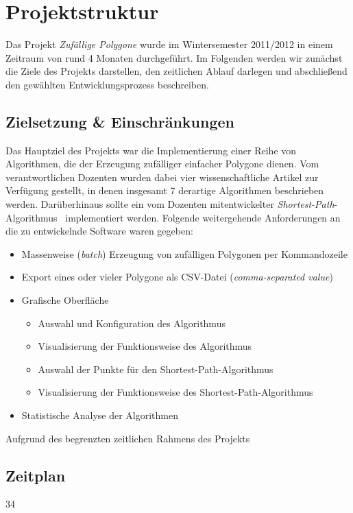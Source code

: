 \section{Projektstruktur}
Das Projekt \emph{Zufällige Polygone} wurde im Wintersemester 2011/2012 in einem Zeitraum von rund 4 Monaten durchgeführt. Im Folgenden werden wir zunächst die Ziele des Projekts darstellen, den zeitlichen Ablauf darlegen und abschließend den gewählten Entwicklungsprozess beschreiben.

\subsection{Zielsetzung \& Einschränkungen}
Das Hauptziel des Projekts war die Implementierung einer Reihe von Algorithmen, die der Erzeugung zufälliger einfacher Polygone dienen. Vom verantwortlichen Dozenten wurden dabei vier wissenschaftliche Artikel zur Verfügung gestellt, in denen insgesamt 7 derartige Algorithmen beschrieben werden. Darüberhinaus sollte ein vom Dozenten mitentwickelter \emph{Shortest-Path}-Algorithmus~\cite{asano11shortestpath} implementiert werden. Folgende weitergehende Anforderungen an die zu entwickelnde Software waren gegeben:
\begin{itemize}
\item Massenweise (\emph{batch}) Erzeugung von zufälligen Polygonen per Kommandozeile
\item Export eines oder vieler Polygone als CSV-Datei (\emph{comma-separated value})
\item Grafische Oberfläche
\begin{itemize}
\item Auswahl und Konfiguration des Algorithmus
\item Visualisierung der Funktionsweise des Algorithmus
\item Auswahl der Punkte für den Shortest-Path-Algorithmus
\item Visualisierung der Funktionsweise des Shortest-Path-Algorithmus
\end{itemize}
\item Statistische Analyse der Algorithmen 
\end{itemize}
Aufgrund des begrenzten zeitlichen Rahmens des Projekts 
\subsection{Zeitplan}
\begin{PstGanttChart}[yunit=2,ChartUnitIntervalName=Month,TaskUnitIntervalValue=30,TaskUnitType=Month,ChartShowIntervals]{3}{4}
\end{PstGanttChart}

